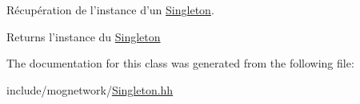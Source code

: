 Récupération de l'instance d'un \hyperlink{classmognetwork_1_1_singleton}{Singleton}. 

\begin{DoxyReturn}{Returns}
l'instance du \hyperlink{classmognetwork_1_1_singleton}{Singleton} 
\end{DoxyReturn}


The documentation for this class was generated from the following file\-:\begin{DoxyCompactItemize}
\item 
include/mognetwork/\hyperlink{_singleton_8hh}{Singleton.\-hh}\end{DoxyCompactItemize}
